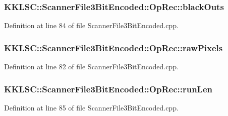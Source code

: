 \subsubsection[{\texorpdfstring{black\+Outs}{blackOuts}}]{ K\+K\+L\+S\+C\+::\+Scanner\+File3\+Bit\+Encoded\+::\+Op\+Rec\+::black\+Outs}\hypertarget{union_scanner_file3_bit_encoded_1_1_op_rec_af0dcad1efdef80164a6e6fdc6f7221be}{}\label{union_scanner_file3_bit_encoded_1_1_op_rec_af0dcad1efdef80164a6e6fdc6f7221be}


Definition at line 84 of file Scanner\+File3\+Bit\+Encoded.\+cpp.

\subsubsection[{\texorpdfstring{raw\+Pixels}{rawPixels}}]{ K\+K\+L\+S\+C\+::\+Scanner\+File3\+Bit\+Encoded\+::\+Op\+Rec\+::raw\+Pixels}\hypertarget{union_scanner_file3_bit_encoded_1_1_op_rec_ae21499d7ed7e38c37950580dbaef5fc0}{}\label{union_scanner_file3_bit_encoded_1_1_op_rec_ae21499d7ed7e38c37950580dbaef5fc0}


Definition at line 82 of file Scanner\+File3\+Bit\+Encoded.\+cpp.

\subsubsection[{\texorpdfstring{run\+Len}{runLen}}]{ K\+K\+L\+S\+C\+::\+Scanner\+File3\+Bit\+Encoded\+::\+Op\+Rec\+::run\+Len}\hypertarget{union_scanner_file3_bit_encoded_1_1_op_rec_a3fbb440291b85aaf74bcf437735ec83e}{}\label{union_scanner_file3_bit_encoded_1_1_op_rec_a3fbb440291b85aaf74bcf437735ec83e}


Definition at line 85 of file Scanner\+File3\+Bit\+Encoded.\+cpp.

